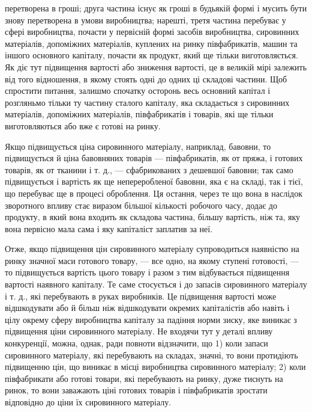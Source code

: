 \parcont{}  %
перетворена в гроші; друга частина існує як гроші в будьякій
формі і мусить бути знову перетворена в умови виробництва;
нарешті, третя частина перебуває у сфері виробництва, почасти
у первісній формі засобів виробництва, сировинних матеріалів,
допоміжних матеріалів, куплених на ринку півфабрикатів,
машин та іншого основного капіталу, почасти як продукт, який
ще тільки виготовляється. Як діє тут підвищення вартості або
зниження вартості, це в великій мірі залежить від того відношення,
в якому стоять одні до одних ці складові частини. Щоб
спростити питання, залишмо спочатку осторонь весь основний
капітал і розгляньмо тільки ту частину сталого капіталу, яка
складається з сировинних матеріалів, допоміжних матеріалів,
півфабрикатів і товарів, які ще тільки виготовляються або вже
є готові на ринку.

Якщо підвищується ціна сировинного матеріалу, наприклад,
бавовни, то підвищується й ціна бавовняних товарів — півфабрикатів,
як от пряжа, і готових товарів, як от тканини і т. д., —
сфабрикованих з дешевшої бавовни; так само підвищується
і вартість як ще непереробленої бавовни, яка є на складі, так
і тієї, що перебуває ще в процесі оброблення. Ця остання,
через те що вона в наслідок зворотного впливу стає виразом
більшої кількості робочого часу, додає до продукту, в який
вона входить як складова частина, більшу вартість, ніж та, яку
вона первісно мала сама і яку капіталіст заплатив за неї.

Отже, якщо підвищення цін сировинного матеріалу супроводиться
наявністю на ринку значної маси готового товару, —
все одно, на якому ступені готовості, — то підвищується вартість
цього товару і разом з тим відбувається підвищення вартості
наявного капіталу. Те саме стосується і до запасів сировинного
матеріалу і т. д., які перебувають в руках виробників.
Це підвищення вартості може відшкодувати або й більш ніж
відшкодувати окремих капіталістів або навіть і цілу окрему
сферу виробництва капіталу за падіння норми зиску, яке виникає
з підвищення ціни сировинного матеріалу. Не входячи тут
у деталі впливу конкуренції, можна, однак, ради повноти відзначити,
що 1) коли запаси сировинного матеріалу, які перебувають
на складах, значні, то вони протидіють підвищенню цін,
що виникає в місці виробництва сировинного матеріалу; 2) коли
півфабрикати або готові товари, які перебувають на ринку, дуже
тиснуть на ринок, то вони заважають ціні готових товарів і півфабрикатів
зростати відповідно до ціни їх сировинного матеріалу.

